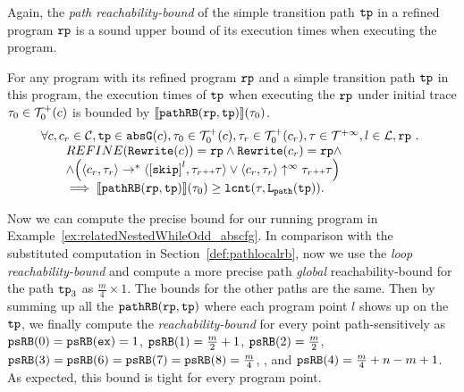 Again, the \emph{path reachability-bound} of the simple transition path $\mathtt{tp}$ in a refined program $\mathtt{rp}$ is a sound upper bound of its execution times when executing the program.
\begin{lem}
  \label{lem:pathrb-sound}
  For any program with its refined program $\mathtt{rp}$ and a simple transition path $\mathtt{tp}$ in this program,
  the execution times of $\mathtt{tp}$ when executing the $\mathtt{rp}$ under initial trace $\mathtt{\tau}_0 \in \mathcal{T}^{+}_0(c)$ is bounded by $\llbracket \mathtt{pathRB}(\mathtt{rp}, \mathtt{tp}) \rrbracket(\mathtt{\tau}_0)$.
  \[
    \begin{array}{l}
    \forall c, c_r \in \cdom, \tpath \in \absG(c), \trace_0 \in \ftdom_0(c),  \trace_r \in \ftdom_0(c_r), \trace \in \tdom, l \in \ldom, \rprog \st 
    \\ \qquad
    REFINE(\algrewrite(c)) = \rprog
    \land 
    \algrewrite(c_r) = \rprog
    \land
    \\ \qquad
    \land 
    \Big(
      \config{c_r, \trace_r} \rightarrow^* \config{\clabel{\eskip}^{l}, \trace_r \tracecat \trace}
      \lor \config{c_r, \trace_r} \uparrow^{\infty} \trace_r \tracecat \trace 
      \Big)
  \\ \qquad
    \implies
    \econfig{\inoutB(\rprog, \tpath)}(\trace_0) \geq \lcounter(\trace, \pathl(\tpath)).
    \end{array}
  \]  
\end{lem}
Now we can compute the precise bound for our running program in Example~\ref{ex:relatedNestedWhileOdd_abscfg}.
In comparison with the substituted computation in Section~\ref{def:pathlocalrb}, now we use the \emph{loop reachability-bound}
and compute a more precise path \emph{global} reachability-bound for the path $\mathtt{tp}_3$ as $\frac{m}{4} \times 1$.
The bounds for the other paths are the same.
Then by summing up all the $\mathtt{pathRB}(\mathtt{rp}, \mathtt{tp})$ where each program point $l$ shows up on the $\mathtt{tp}$, we finally compute
the \emph{reachability-bound} for every point path-sensitively as
$\mathtt{psRB}(0) = \mathtt{psRB}(\mathtt{ex}) = 1$,
$\mathtt{psRB}(1) = \frac{m}{2} + 1$,
$\mathtt{psRB}(2) = \frac{m}{2} $, 
$\mathtt{psRB}(3) = \mathtt{psRB}(6) = \mathtt{psRB}(7)  = \mathtt{psRB}(8) = \frac{m}{4} $,
,
and $\mathtt{psRB}(4) =  \frac{m}{4} + n - m + 1$.
As expected, this bound is tight for every program point.

